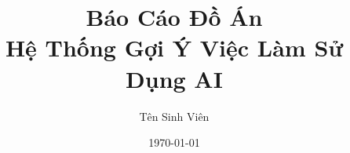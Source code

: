 \documentclass[12pt,a4paper]{report}
\begin{document}
\title{Báo Cáo Đồ Án\\Hệ Thống Gợi Ý Việc Làm Sử Dụng AI}
\author{Tên Sinh Viên}
\date{\today}

\maketitle

\tableofcontents
\listoffigures
\listoftables

\mainmatter

% 
% 
% 



% 
% 

% 
% 

% 
\end{document}
